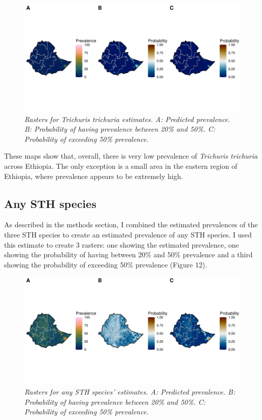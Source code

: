 \documentclass[
]{article}
\begin{document}
\begin{figure}
\centering
\includegraphics{write_up_files/figure-latex/TT.prediction.rasters-1.pdf}
\caption{\emph{Rasters for Trichuris trichuria estimates. A: Predicted
prevalence. B: Probability of having prevalence between 20\% and 50\%.
C: Probability of exceeding 50\% prevalence.}}
\end{figure}

These maps show that, overall, there is very low prevalence of
\emph{Trichuris trichuria} across Ethiopia. The only exception is a
small area in the eastern region of Ethiopia, where prevalence appears
to be extremely high.

\newpage

\hypertarget{any-sth-species}{%
\subsection{Any STH species}\label{any-sth-species}}

As described in the methods section, I combined the estimated
prevalences of the three STH species to create an estimated prevalence
of any STH species. I used this estimate to create 3 rasters: one
showing the estimated prevalence, one showing the probability of having
between 20\% and 50\% prevalence and a third showing the probability of
exceeding 50\% prevalence (Figure 12).

\begin{figure}
\centering
\includegraphics{write_up_files/figure-latex/any.sth.prediction.rasters-1.pdf}
\caption{\emph{Rasters for any STH species' estimates. A: Predicted
prevalence. B: Probability of having prevalence between 20\% and 50\%.
C: Probability of exceeding 50\% prevalence.}}
\end{figure}
\end{document}
